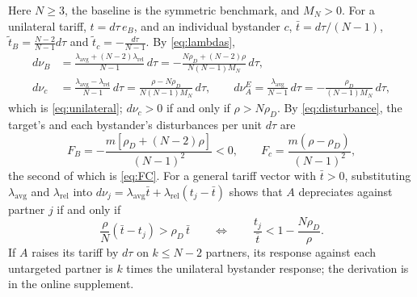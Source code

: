 Here $N\geq3$, the baseline is the symmetric benchmark, and $M_N>0$. For a unilateral tariff, $t=d\tau\,e_B$, and an individual bystander $c$, $\bar t=d\tau/(N-1)$, $\widetilde t_B=\frac{N-2}{N-1}d\tau$ and $\widetilde t_c=-\frac{d\tau}{N-1}$. By \cref{eq:lambdas},
\begin{equation*}
\begin{aligned}
d\nu_B&=\frac{\lambda_{\mathrm{avg}}+(N-2)\lambda_{\mathrm{rel}}}{N-1}\,d\tau=-\frac{N\rho_D+(N-2)\rho}{N(N-1)M_N}\,d\tau,\\
d\nu_c&=\frac{\lambda_{\mathrm{avg}}-\lambda_{\mathrm{rel}}}{N-1}\,d\tau=\frac{\rho-N\rho_D}{N(N-1)M_N}\,d\tau,\qquad
d\nu^E_A=\frac{\lambda_{\mathrm{avg}}}{N-1}\,d\tau=-\frac{\rho_D}{(N-1)M_N}\,d\tau,
\end{aligned}
\end{equation*}
which is \cref{eq:unilateral}; $d\nu_c>0$ if and only if $\rho>N\rho_D$. By \cref{eq:disturbance}, the target's and each bystander's disturbances per unit $d\tau$ are
\begin{equation*}
F_B=-\frac{m[\rho_D+(N-2)\rho]}{(N-1)^2}<0,\qquad F_c=\frac{m(\rho-\rho_D)}{(N-1)^2},
\end{equation*}
the second of which is \cref{eq:FC}. For a general tariff vector with $\bar t>0$, substituting $\lambda_{\mathrm{avg}}$ and $\lambda_{\mathrm{rel}}$ into $d\nu_j=\lambda_{\mathrm{avg}}\bar t+\lambda_{\mathrm{rel}}(t_j-\bar t)$ shows that $A$ depreciates against partner $j$ if and only if
\begin{equation}
\frac{\rho}{N}(\bar t-t_j)>\rho_D\,\bar t\qquad\Longleftrightarrow\qquad\frac{t_j}{\bar t}<1-\frac{N\rho_D}{\rho}.
\label{eq:reltreat}
\end{equation}
If $A$ raises its tariff by $d\tau$ on $k\leq N-2$ partners, its response against each untargeted partner is $k$ times the unilateral bystander response; the derivation is in the online supplement.
